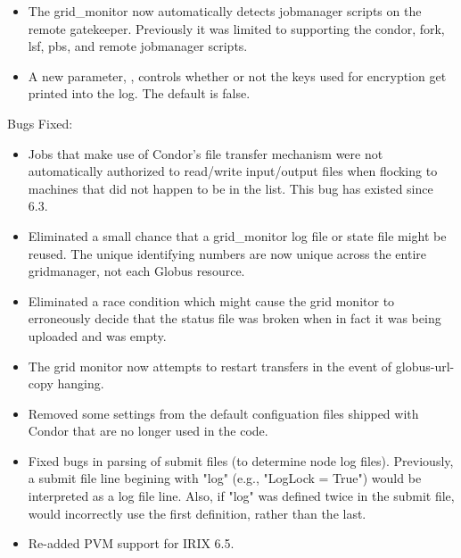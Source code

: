 \begin{itemize}
\item The grid\_monitor now automatically detects jobmanager scripts on the
      remote gatekeeper.  Previously it was limited to supporting the condor,
	  fork, lsf, pbs, and remote jobmanager scripts.

\item A new parameter, , controls whether or not
      the keys used for encryption get printed into the log.
	  The default is false.


\end{itemize}

\noindent Bugs Fixed:

\begin{itemize}

\item Jobs that make use of Condor's file transfer mechanism were not
automatically authorized to read/write input/output files when
flocking to machines that did not happen to be in the
 list.  This bug has existed since 6.3.

\item Eliminated a small chance that a grid\_monitor log file or state file
    might be reused.  The unique identifying numbers are now unique across
	the entire gridmanager, not each Globus resource.

\item Eliminated a race condition which might cause the grid monitor to
	erroneously decide that the status file was broken when in fact it
	was being uploaded and was empty.

\item The grid monitor now attempts to restart transfers in the event of
    globus-url-copy hanging.

\item Removed some settings from the default configuation files
  shipped with Condor that are no longer used in the code.

\item Fixed bugs in  parsing of submit files (to determine
  node log files).  Previously, a submit file line begining with
  "log" (e.g., "LogLock = True") would be interpreted as a log file
  line.  Also, if "log" was defined twice in the submit file,
   would incorrectly use the first definition, rather than
  the last.

\item Re-added PVM support for IRIX 6.5.


\end{itemize}
